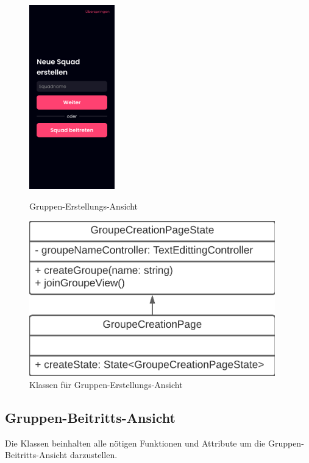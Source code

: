 \documentclass[parskip=full]{scrartcl}
\begin{document}
    \begin{figure}[htp]
        \begin{minipage}
            [t]{0.49\textwidth}
            \centering
            \includegraphics[height=80mm]{images/Presentation-layer/GroupCreationView.jpg}
            \caption{Gruppen-Erstellungs-Ansicht}
        \end{minipage}
        \begin{minipage}
            [t]{0.49\textwidth}
            \centering
            \includegraphics[width=0.95\textwidth]{images/Presentation-layer/GroupCreationViewClass.png}
            \caption{Klassen für Gruppen-Erstellungs-Ansicht}
        \end{minipage}
    \end{figure}    
        
    \newpage

\subsection{Gruppen-Beitritts-Ansicht}
    Die Klassen beinhalten alle nötigen Funktionen und Attribute um die Gruppen-Beitritts-Ansicht darzustellen.
\end{document}
